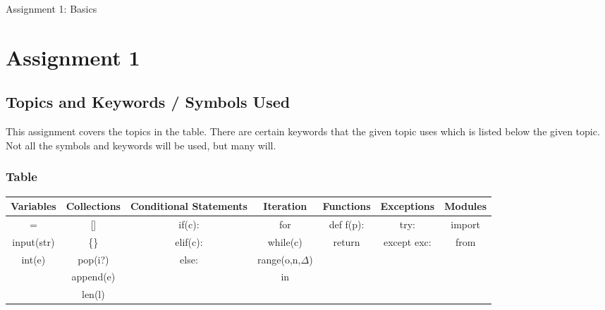 \documentclass[12pt]{report}
\begin{document}
\begin{titlepage}
    \begin{center}
  \begin{LARGE}
    \vspace*{5cm}
        Assignment 1: Basics
        
    \end{LARGE}  
    \vspace*{0.1cm}
\end{center}
\end{titlepage}
\chapter*{Assignment 1}

\section*{Topics and Keywords / Symbols Used}

This assignment covers the topics in the table. 
There are certain keywords that the given topic uses which is listed below the given topic. 
Not all the symbols and keywords will be used, but many will.


\subsection*{Table}

\begin{tabular}{ | c | c | c | c | c | c | c |}
    \hline
    Variables & Collections & Conditional Statements & Iteration & Functions & Exceptions & Modules \\
    \hline
    \noalign{\smallskip}\noalign{\smallskip}\noalign{\smallskip}\noalign{\smallskip}
    \hline
    = & [] & if(c): & for & def f(p):& try: & import \\
    \hline
    input(str) & \{\} & elif(c): & while(c) & return & except exc: & from \\
    \hline
    int(e) & pop(i?) & else: & range(o,n,${\Delta}$) &&& \\
    \hline
    & append(e) && in &&&\\ 
    \hline
    & len(l) &&&&& \\
    \hline

\end{tabular}
\end{document}
